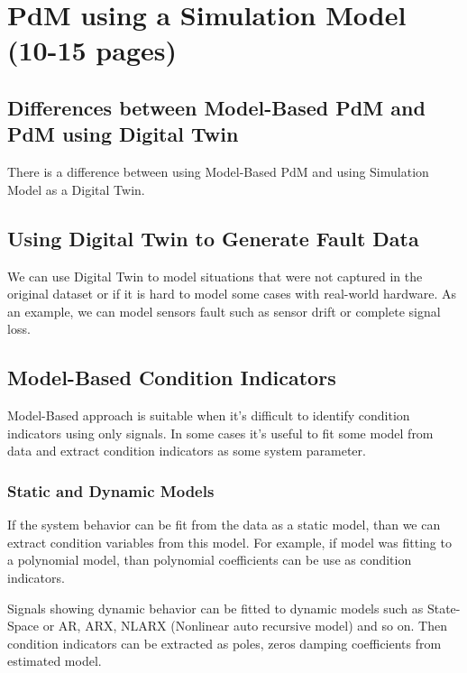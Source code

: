 %


\chapter{PdM using a Simulation Model (10-15 pages)}

\section{Differences between Model-Based PdM and PdM using Digital Twin}
There is a difference between using Model-Based PdM and using Simulation
Model as a Digital Twin.

\section{Using Digital Twin to Generate Fault Data}
We can use Digital Twin to model situations that were not captured in the
original dataset or if it is hard to model some cases with real-world
hardware. As an example, we can model sensors fault such as sensor drift or
complete signal loss.

\section{Model-Based Condition Indicators}
Model-Based approach is suitable when it's difficult to identify condition
indicators using only signals. In some cases it's useful to fit some model
from data and extract condition indicators as some system parameter.

\subsection{Static and Dynamic Models}
If the system behavior can be fit from the data as a static model, than we
can extract condition variables from this model. For example, if model
was fitting to a polynomial model, than polynomial coefficients can be use
as condition indicators.

Signals showing dynamic behavior can be fitted to dynamic models such as
State-Space or AR, ARX, NLARX (Nonlinear auto recursive model) and so on.
Then condition indicators can be extracted as poles, zeros damping
coefficients from estimated model.


